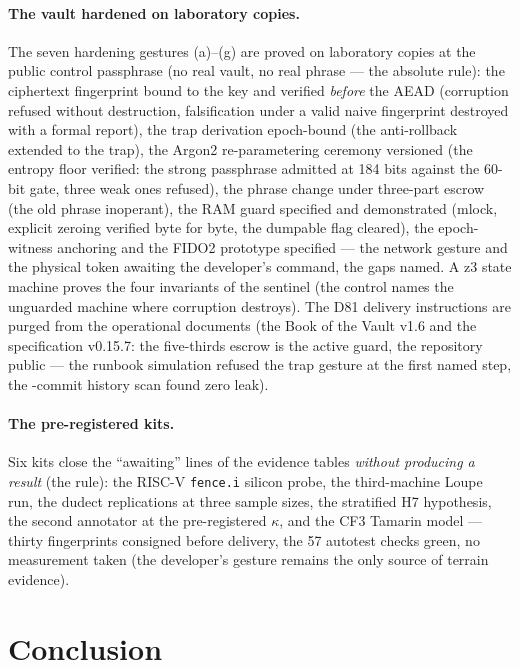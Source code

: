 \documentclass[11pt,a4paper]{article}
\newcommand{\code}[1]{\texttt{\small #1}}
\begin{document}
\paragraph{The vault hardened on laboratory copies.} The seven
hardening gestures (a)--(g) are proved on laboratory copies at the
public control passphrase (no real vault, no real phrase --- the
absolute rule): the ciphertext fingerprint bound to the key and
verified \emph{before} the AEAD (corruption refused without
destruction, falsification under a valid naive fingerprint destroyed
with a formal report), the trap derivation epoch-bound (the
anti-rollback extended to the trap), the Argon2 re-parametering
ceremony versioned (the entropy floor verified: the strong passphrase
admitted at 184 bits against the 60-bit gate, three weak ones
refused), the phrase change under three-part escrow (the old phrase
inoperant), the RAM guard specified and demonstrated (mlock,
explicit zeroing verified byte for byte, the dumpable flag cleared),
the epoch-witness anchoring and the FIDO2 prototype specified --- the
network gesture and the physical token awaiting the developer's
command, the gaps named. A z3 state machine proves the four
invariants of the sentinel (the control names the unguarded machine
where corruption destroys). The D81 delivery instructions are
purged from the operational documents (the Book of the Vault v1.6
and the specification v0.15.7: the five-thirds escrow is the active
guard, the repository public --- the runbook simulation refused the
trap gesture at the first named step, the \purgeCommitsScannes{}-commit
history scan found zero leak).

\paragraph{The pre-registered kits.} Six kits close the ``awaiting''
lines of the evidence tables \emph{without producing a result} (the
rule): the RISC-V \code{fence.i} silicon probe, the third-machine
Loupe run, the dudect replications at three sample sizes, the
stratified H7 hypothesis, the second annotator at the pre-registered
$\kappa$, and the CF3 Tamarin model --- thirty fingerprints consigned
before delivery, the 57 autotest checks green, no measurement taken
(the developer's gesture remains the only source of terrain evidence).

\section{Conclusion}\label{sec:conclusion}
\end{document}
